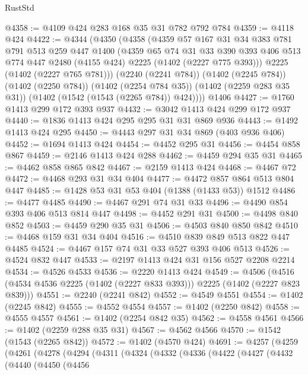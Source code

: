 \begin{lexlean}{RustStd}
\begin{coremodule}
@4358 := @4109 @424 @283 @168 @35 @31 @782 @792 @784
@4359 := @4118 @424
@4422 := @4344
    (@4350
      (@4358
        (@4359
          @57
          @167
          @31
          @34
          @383
          @781
          @791
          @513
          @259
          @447
          @1400
          (@4359
            @65
            @74
            @31
            @33
            @390
            @393
            @406
            @513
            @774
            @447
            @2480
            (@4155 @424)
            @2225
            (@1402 (@2227 @775 @393)))
          @2225
          (@1402 (@2227 @765 @781)))
        (@2240 (@2241 @784))
        (@1402 (@2245 @784))
        (@1402 (@2250 @784))
        (@1402 (@2254 @784 @35))
        (@1402 (@2259 @283 @35 @31))
        (@1402 (@1542 (@1543 (@2265 @784)) @424))))
    @1406
@4427 := @1760 @1413 @299 @172 @393 @937
@4432 := @3042 @1413 @424 @299 @172 @937
@4440 := @1836 @1413 @424 @295 @295 @31 @31 @869 @936
@4443 := @1492 @1413 @424 @295
@4450 := @4443 @297 @31 @34 @869 (@403 @936 @406)
@4452 := @1694 @1413 @424
@4454 := @4452 @295 @31
@4456 := @4454 @858 @867
@4459 := @2146 @1413 @424 @288
@4462 := @4459 @294 @35 @31
@4465 := @4462 @858 @865 @842
@4467 := @2159 @1413 @424
@4468 := @4467 @72
@4472 := @4468 @293 @31 @34 @404
@4477 := @4472 @857 @864 @513 @804 @447
@4485 := @1428 @53 @31 @53 @404 (@1388 (@1433 @53)) @1512
@4486 := @4477 @4485
@4490 := @4467 @291 @74 @31 @33
@4496 := @4490 @854 @393 @406 @513 @814 @447
@4498 := @4452 @291 @31
@4500 := @4498 @840 @852
@4503 := @4459 @290 @35 @31
@4506 := @4503 @840 @850 @842
@4510 := @4468 @159 @31 @34 @404
@4516 := @4510 @839 @849 @513 @822 @447 @4485
@4524 := @4467 @157 @74 @31 @33 @527 @393 @406 @513
@4526 := @4524 @832 @447
@4533 := @2197 @1413 @424 @31 @156 @527 @2208 @2214
@4534 := @4526 @4533
@4536 := @2220 @1413 @424
@4549 := @4506 (@4516 (@4534 @4536 @2225 (@1402 (@2227 @833 @393))) @2225 (@1402 (@2227 @823 @839)))
@4551 := @2240 (@2241 @842)
@4552 := @4549 @4551
@4554 := @1402 (@2245 @842)
@4555 := @4552 @4554
@4557 := @1402 (@2250 @842)
@4558 := @4555 @4557
@4561 := @1402 (@2254 @842 @35)
@4562 := @4558 @4561
@4566 := @1402 (@2259 @288 @35 @31)
@4567 := @4562 @4566
@4570 := @1542 (@1543 (@2265 @842))
@4572 := @1402 (@4570 @424)
@4691 := @4257
    (@4259
      (@4261
        (@4278
          (@4294
            (@4311
              (@4324
                (@4332
                  (@4336
                    (@4422
                      (@4427
                        (@4432
                          (@4440
                            (@4450
                              (@4456

\end{coremodule}
\end{lexlean}
